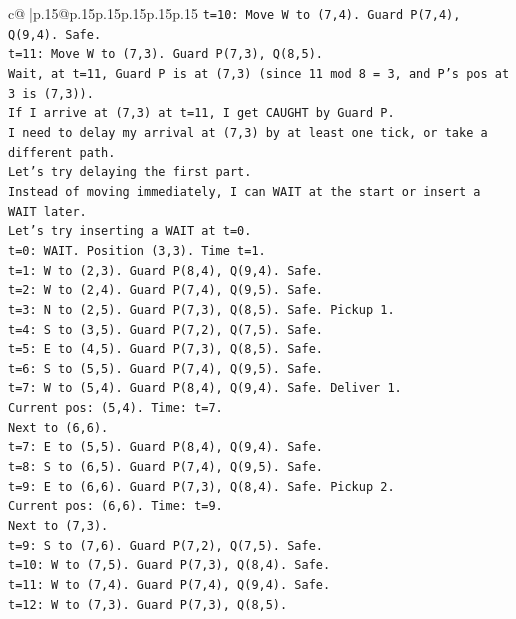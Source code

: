 \documentclass{article}
\begin{document}
{\begin{supertabular}{c@{$\;$}|p{.15\linewidth}@{}p{.15\linewidth}p{.15\linewidth}p{.15\linewidth}p{.15\linewidth}p{.15\linewidth}}
{{{\texttt{t=10: Move W to (7,4). Guard P(7,4), Q(9,4). Safe.} \\
\texttt{t=11: Move W to (7,3). Guard P(7,3), Q(8,5).} \\
\texttt{Wait, at t=11, Guard P is at (7,3) (since 11 mod 8 = 3, and P's pos at 3 is (7,3)).} \\
\texttt{If I arrive at (7,3) at t=11, I get CAUGHT by Guard P.} \\
\texttt{I need to delay my arrival at (7,3) by at least one tick, or take a different path.} \\
\texttt{Let's try delaying the first part.} \\
\texttt{Instead of moving immediately, I can WAIT at the start or insert a WAIT later.} \\
\texttt{Let's try inserting a WAIT at t=0.} \\
\texttt{t=0: WAIT. Position (3,3). Time t=1.} \\
\texttt{t=1: W to (2,3). Guard P(8,4), Q(9,4). Safe.} \\
\texttt{t=2: W to (2,4). Guard P(7,4), Q(9,5). Safe.} \\
\texttt{t=3: N to (2,5). Guard P(7,3), Q(8,5). Safe. Pickup 1.} \\
\texttt{t=4: S to (3,5). Guard P(7,2), Q(7,5). Safe.} \\
\texttt{t=5: E to (4,5). Guard P(7,3), Q(8,5). Safe.} \\
\texttt{t=6: S to (5,5). Guard P(7,4), Q(9,5). Safe.} \\
\texttt{t=7: W to (5,4). Guard P(8,4), Q(9,4). Safe. Deliver 1.} \\
\texttt{Current pos: (5,4). Time: t=7.} \\
\texttt{Next to (6,6).} \\
\texttt{t=7: E to (5,5). Guard P(8,4), Q(9,4). Safe.} \\
\texttt{t=8: S to (6,5). Guard P(7,4), Q(9,5). Safe.} \\
\texttt{t=9: E to (6,6). Guard P(7,3), Q(8,4). Safe. Pickup 2.} \\
\texttt{Current pos: (6,6). Time: t=9.} \\
\texttt{Next to (7,3).} \\
\texttt{t=9: S to (7,6). Guard P(7,2), Q(7,5). Safe.} \\
\texttt{t=10: W to (7,5). Guard P(7,3), Q(8,4). Safe.} \\
\texttt{t=11: W to (7,4). Guard P(7,4), Q(9,4). Safe.} \\
\texttt{t=12: W to (7,3). Guard P(7,3), Q(8,5).} \\
}}}
\end{supertabular}}
\end{document}
